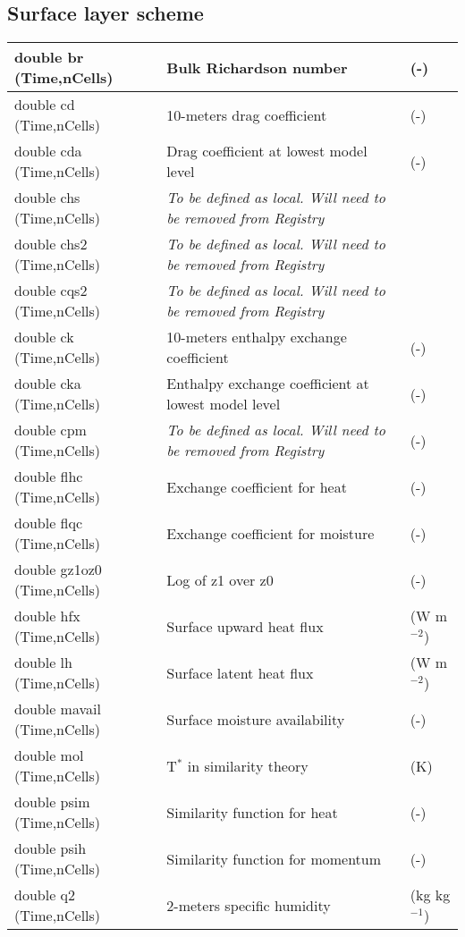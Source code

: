 \subsection{Surface layer scheme}

{\small
\begin{longtable}{|p{2.0in} |p{3.0in} |p{1.0in} |}
\hline
double br (Time,nCells) & Bulk Richardson number & (-) \\ \hline
double cd (Time,nCells) & 10-meters drag coefficient & (-) \\ \hline
double cda (Time,nCells) & Drag coefficient at lowest model level & (-) \\ \hline
double chs (Time,nCells) & \em{To be defined as local. Will need to be removed from Registry} & \\ \hline
double chs2 (Time,nCells) & \em{To be defined as local. Will need to be removed from Registry} & \\ \hline
double cqs2 (Time,nCells) & \em{To be defined as local. Will need to be removed from Registry} & \\ \hline
double ck (Time,nCells) & 10-meters enthalpy exchange coefficient & (-) \\ \hline
double cka (Time,nCells) &  Enthalpy exchange coefficient at lowest model level & (-) \\ \hline
double cpm (Time,nCells) & \em{To be defined as local. Will need to be removed from Registry} & (-) \\ \hline
double flhc (Time,nCells) & Exchange coefficient for heat & (-) \\ \hline
double flqc (Time,nCells) & Exchange coefficient for moisture & (-) \\ \hline
double gz1oz0 (Time,nCells) & Log of z1 over z0 & (-) \\ \hline
double hfx (Time,nCells) & Surface upward heat flux & (W m$^{-2}$) \\ \hline
double lh (Time,nCells) & Surface latent heat flux & (W m$^{-2}$) \\ \hline
double mavail (Time,nCells) & Surface moisture availability & (-) \\ \hline
double mol (Time,nCells) &  T$^{*}$ in similarity theory & (K) \\ \hline
double psim (Time,nCells) & Similarity function for heat & (-) \\ \hline
double psih (Time,nCells) & Similarity function for momentum & (-) \\ \hline
double q2 (Time,nCells) & 2-meters specific humidity & (kg kg$^{-1}$) \\ \hline

\end{longtable}}
